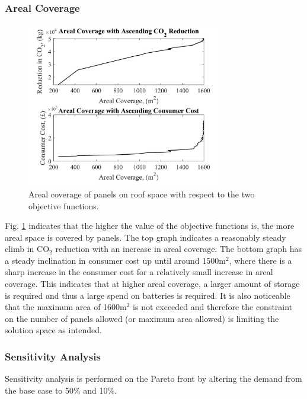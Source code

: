 \subsubsection{Areal Coverage}
\vspace*{1mm}
\begin{figure}[H]
	\centering
    \includegraphics[width=245pt]{Figures/ArealCoverage.jpg}
    \caption{Areal coverage of panels on roof space with respect to the two objective functions.}
    \label{fig:ArealCoverage}
\end{figure}

Fig. \ref{fig:ArealCoverage} indicates that the higher the value of the objective functions is, the more areal space is covered by panels. The top graph indicates a reasonably steady climb in CO$_2$ reduction with an increase in areal coverage. The bottom graph has a steady inclination in consumer cost up until around 1500m$^2$, where there is a sharp increase in the consumer cost for a relatively small increase in areal coverage. This indicates that at higher areal coverage, a larger amount of storage is required and thus a large spend on batteries is required. It is also noticeable that the maximum area of 1600m$^2$ is not exceeded and therefore the constraint on the number of panels allowed (or maximum area allowed) is limiting the solution space as intended.

\subsubsection{Sensitivity Analysis}

Sensitivity analysis is performed on the Pareto front by altering the demand from the base case to 50\% and 10\%.

